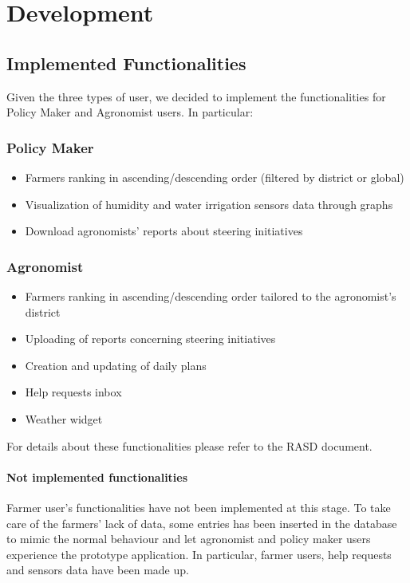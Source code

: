 \documentclass[table, 12pt]{article}
\begin{document}
\newpage
\section{Development}
\subsection{Implemented Functionalities}
Given the three types of user, we decided to implement the functionalities for Policy Maker and Agronomist users. In particular:
\subsubsection*{Policy Maker}
\begin{itemize}
    \item Farmers ranking in ascending/descending order (filtered by district or global)
    \item Visualization of humidity and water irrigation sensors data through graphs
    \item Download agronomists' reports about steering initiatives
\end{itemize}
\subsubsection*{Agronomist}
\begin{itemize}
    \item Farmers ranking in ascending/descending order tailored to the agronomist's district
    \item Uploading of reports concerning steering initiatives
    \item Creation and updating of daily plans
    \item Help requests inbox
    \item Weather widget
\end{itemize}
For details about these functionalities please refer to the RASD document.

\paragraph{Not implemented functionalities}
Farmer user's functionalities have not been implemented at this stage. To take care of the farmers' lack of data, some entries has been inserted in the database to mimic the normal behaviour and let agronomist and policy maker users experience the prototype application. In particular, farmer users, help requests and sensors data have been made up.
\newpage
\end{document}
